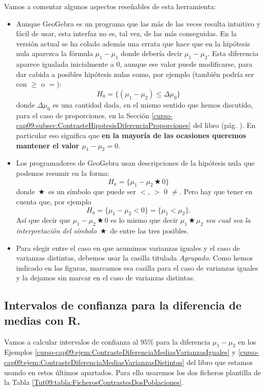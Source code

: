 \documentclass[10pt,a4paper]{article}\usepackage[]{graphicx}\usepackage[]{color}
\begin{document}
Vamos a comentar algunos aspectos reseñables de esta herramienta:

\begin{itemize}
  \item Aunque GeoGebra es un programa que las más de las veces resulta intuitivo y fácil de usar, esta interfaz no es, tal vez, de las más conseguidas. En la versión actual se ha colado además una errata que hace que en la hipótesis nula aparezca la fórmula $\mu_1 - \mu_1$ donde debería decir $\mu_1 - \mu_2$. Esta diferencia aparece igualada inicialmente a $0$, aunque ese valor puede modificarse, para dar cabida a posibles hipótesis nulas como, por ejemplo (también podría ser con $\geq$ o $=$):
        \[H_0 = \{(\mu_1-\mu_2)\leq \Delta \mu_0\}\]
      donde $\Delta \mu_0$ es una cantidad dada, en el mismo sentido que hemos discutido, para el caso de proporciones, en la Sección \ref{curso-cap09:subsec:ContrasteHipotesisDiferenciaProporciones} del libro (pág. \pageref{curso-cap09:subsec:ContrasteHipotesisDiferenciaProporciones}). En particular eso significa que {\bf en la mayoría de las ocasiones queremos mantener el valor $\mu_1 - \mu_2 = 0$}.
  \item Los programadores de GeoGebra usan descripciones de la hipótesis nula que podemos resumir en la forma:
        \[H_a = \{\mu_1 - \mu_2 \,\bigstar\, 0\}\]
        donde $\,\bigstar\,$ es un símbolo que puede ser $<$, $>$ 0 $\neq$. Pero hay que tener en cuenta que, por ejemplo
        \[H_a = \{\mu_1 - \mu_2 < 0\} = \{\mu_1 < \mu_2\}.\]
        Así que decir que $\mu_1 - \mu_2 \,\bigstar\, 0$ es lo mismo que decir $\mu_1 \,\bigstar\,  \mu_2 $ {\em sea cual sea la interpretación del símbolo } $\,\bigstar\,$ de entre las tres posibles.
  \item Para elegir entre el caso en que asumimos varianzas iguales y el caso de varianzas distintas, debemos usar la casilla titulada {\em Agrupado}. Como hemos indicado en las figuras, marcamos esa casilla para el caso de varianzas iguales y la dejamos sin marcar en el caso de varianzas distintas.

\end{itemize}

\subsection{Intervalos de confianza para la diferencia de medias con R.}

Vamos a calcular intervalos de confianza al $95\%$ para la diferencia $\mu_1 - \mu_2$ en los Ejemplos \ref{curso-cap09:ejem:ContrasteDiferenciaMediasVarianzasIguales} y \ref{curso-cap09:ejem:ContrasteDiferenciaMediasVarianzasDistintas} del libro que estamos usando en estos últimos apartados. Para ello usaremos los dos ficheros plantilla de la Tabla \ref{Tut09:tabla:FicherosContrastesDosPoblaciones}.
\end{document}
